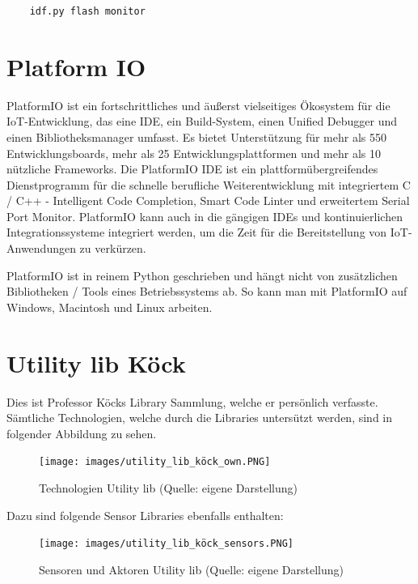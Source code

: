 \begin{verbatim}
    idf.py flash monitor
\end{verbatim}


\section{Platform IO}\label{sec:platformio}

PlatformIO ist ein fortschrittliches und äußerst vielseitiges Ökosystem für die IoT-Entwicklung, das eine IDE, ein Build-System, einen Unified Debugger und einen Bibliotheksmanager umfasst. Es bietet Unterstützung für mehr als 550 Entwicklungsboards, mehr als 25 Entwicklungsplattformen und mehr als 10 nützliche Frameworks. Die PlatformIO IDE ist ein plattformübergreifendes Dienstprogramm für die schnelle berufliche Weiterentwicklung mit integriertem C / C++ - Intelligent Code Completion, Smart Code Linter und erweitertem Serial Port Monitor. PlatformIO kann auch in die gängigen IDEs und kontinuierlichen Integrationssysteme integriert werden, um die Zeit für die Bereitstellung von IoT-Anwendungen zu verkürzen.\cite{platformio_about_us}

PlatformIO ist in reinem Python geschrieben und hängt nicht von zusätzlichen Bibliotheken / Tools eines Betriebssystems ab. So kann man mit PlatformIO auf Windows, Macintosh und Linux arbeiten.


\section{Utility lib Köck}\label{sec:utility-lib-koeck}
Dies ist Professor Köcks Library Sammlung, welche er persönlich verfasste. Sämtliche Technologien, welche durch die Libraries untersützt werden, sind in folgender Abbildung zu sehen.

\begin{figure}[H]
    \begin{center}
        \texttt{[image: images/utility\_lib\_köck\_own.PNG]}
        \caption{Technologien Utility lib (Quelle: eigene Darstellung)}
    \end{center}
\end{figure}

\pagebreak
Dazu sind folgende Sensor Libraries ebenfalls enthalten:

\begin{figure}[H]
    \begin{center}
        \texttt{[image: images/utility\_lib\_köck\_sensors.PNG]}
        \caption{Sensoren und Aktoren Utility lib (Quelle: eigene Darstellung)}
    \end{center}
\end{figure}

